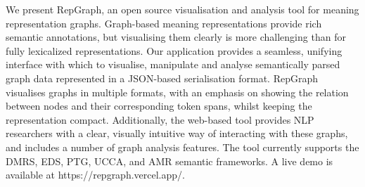 We present RepGraph, an open source visualisation and analysis tool for meaning representation graphs. Graph-based meaning representations provide rich semantic annotations, but visualising them clearly is more challenging than for fully lexicalized representations.
Our application provides a seamless, unifying interface with which to visualise, manipulate and analyse semantically parsed graph data represented in a JSON-based serialisation format. 
RepGraph visualises graphs in multiple formats, with an emphasis on showing the relation between nodes and their corresponding token spans, whilst keeping the representation compact. 
Additionally, the web-based tool provides NLP researchers with a clear, visually intuitive way of interacting with these graphs, and includes a number of graph analysis features.
The tool currently supports the DMRS, EDS, PTG, UCCA, and AMR semantic frameworks. A live demo is available at https://repgraph.vercel.app/.